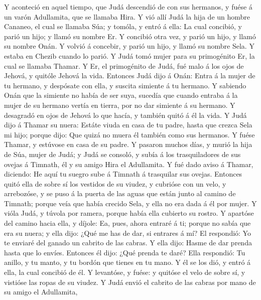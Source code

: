  Y aconteció en aquel tiempo, que Judá descendió de con
sus hermanos, y fuése á un varón Adullamita, que se llamaba Hira.
 Y vió allí Judá la hija de un hombre Cananeo, el cual se
llamaba Súa; y tomóla, y entró á ella:  La cual concibió,
y parió un hijo; y llamó su nombre Er.  Y concibió otra
vez, y parió un hijo, y llamó su nombre Onán.  Y volvió á
concebir, y parió un hijo, y llamó su nombre Sela. Y estaba en Chezib
cuando lo parió.  Y Judá tomó mujer para su primogénito
Er, la cual se llamaba Thamar.  Y Er, el primogénito de
Judá, fué malo á los ojos de Jehová, y quitóle Jehová la vida.
 Entonces Judá dijo á Onán: Entra á la mujer de tu
hermano, y despósate con ella, y suscita simiente á tu hermano.
 Y sabiendo Onán que la simiente no había de ser suya,
sucedía que cuando entraba á la mujer de su hermano vertía en tierra,
por no dar simiente á su hermano.  Y desagradó en ojos de
Jehová lo que hacía, y también quitó á él la vida.  Y
Judá dijo á Thamar su nuera: Estáte viuda en casa de tu padre, hasta que
crezca Sela mi hijo; porque dijo: Que quizá no muera él también como sus
hermanos. Y fuése Thamar, y estúvose en casa de su padre.
 Y pasaron muchos días, y murió la hija de Súa, mujer de
Judá; y Judá se consoló, y subía á los trasquiladores de sus ovejas á
Timnath, él y su amigo Hira el Adullamita.  Y fué dado
aviso á Thamar, diciendo: He aquí tu suegro sube á Timnath á trasquilar
sus ovejas.  Entonces quitó ella de sobre sí los vestidos
de su viudez, y cubrióse con un velo, y arrebozóse, y se puso á la
puerta de las aguas que están junto al camino de Timnath; porque veía
que había crecido Sela, y ella no era dada á él por mujer.
 Y vióla Judá, y túvola por ramera, porque había ella
cubierto su rostro.  Y apartóse del camino hacia ella, y
díjole: Ea, pues, ahora entraré á ti; porque no sabía que era su nuera;
y ella dijo: ¿Qué me has de dar, si entrares á mí?  El
respondió: Yo te enviaré del ganado un cabrito de las cabras. Y ella
dijo: Hasme de dar prenda hasta que lo envíes.  Entonces
él dijo: ¿Qué prenda te daré? Ella respondió: Tu anillo, y tu manto, y
tu bordón que tienes en tu mano. Y él se los dió, y entró á ella, la
cual concibió de él.  Y levantóse, y fuése: y quitóse el
velo de sobre sí, y vistióse las ropas de su viudez.  Y
Judá envió el cabrito de las cabras por mano de su amigo el Adullamita,

